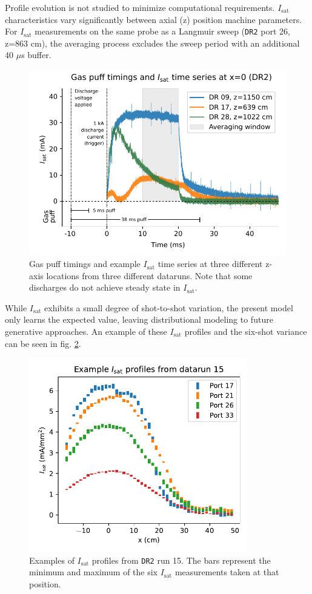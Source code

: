 Profile evolution is not studied to minimize computational requirements. $I_\text{sat}$ characteristics vary significantly between axial (z) position machine parameters. For $I_\text{sat}$ measurements on the same probe as a Langmuir sweep (\texttt{DR2} port 26, z=863 cm), the averaging process excludes the sweep period with an additional 40 $\mu$s buffer. 

\begin{figure}
	\centering
	\includegraphics[width=370pt]{figures/PP1_time-series-example.pdf}
	\caption{\label{fig:PP1_time-series-example}Gas puff timings and example $I_\text{sat}$ time series at three different z-axis locations from three different dataruns. Note that some discharges do not achieve steady state in $I_\text{sat}$. }
\end{figure}

While $I_\text{sat}$ exhibits a small degree of shot-to-shot variation, the present model only learns the expected value, leaving distributional modeling to future generative approaches. An example of these $I_\text{sat}$ profiles and the six-shot variance can be seen in fig. \ref{fig:PP1_isat_example}.

\begin{figure}
	\centering
	\includegraphics[width=270pt]{figures/PP1_isat_example_bars.pdf}
	\caption[Examples of $I_\text{sat}$ profiles from \texttt{DR2}]{\label{fig:PP1_isat_example}Examples of $I_\text{sat}$ profiles from \texttt{DR2} run 15. The bars represent the minimum and maximum of the six $I_\text{sat}$ measurements taken at that position. }
\end{figure}

